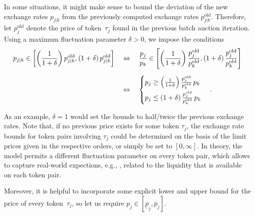 \documentclass[11pt,parskip=full]{scrartcl}%
\newcommand*{\eg}{e.g., }
\begin{document}
In some situations, it might make sense to bound the deviation of the new exchange rates $p_{j|k}$ from the previously computed exchange rates $ p_{j|k}^\mathrm{old} $.
Therefore, let $ p^\mathrm{old}_j $ denote the price of token~$ \tau_j $ found in the previous
batch auction iteration.
Using a maximum fluctuation parameter $ \delta > 0 $, we impose the conditions
\begin{align}
  p_{j|k} \in
  \left[
    \left(\frac{1}{1+\delta}\right) p^\mathrm{old}_{j|k},
    (1+\delta) \, p^\mathrm{old}_{j|k}
  \right]
  \quad &\Leftrightarrow \quad
  \frac{p_j}{p_k} \in
  \left[
    \left(\frac{1}{1+\delta}\right) \frac{p^\mathrm{old}_j}{p^\mathrm{old}_k},
    (1+\delta) \, \frac{p^\mathrm{old}_j}{p^\mathrm{old}_k}
  \right]\notag\\[2mm]
  \quad &\Leftrightarrow \quad
  \begin{cases}
    p_j \ge \left(\frac{1}{1+\delta}\right) \frac{p^\mathrm{old}_j}{p^\mathrm{old}_k} \, p_k
    \\[2mm]
    p_j \le \left(1+\delta\right) \frac{p^\mathrm{old}_j}{p^\mathrm{old}_k} \, p_k
  \end{cases}.
  \label{eq:bounds_xrates}
\end{align}

As an example, $ \delta = 1 $ would set the bounds to half/twice the previous exchange rates.
Note that, if no previous price exists for some token $ \tau_j $, the exchange rate bounds for
token pairs involving $ \tau_j $ could be determined on the basis of the limit prices given in
the respective orders, or simply be set to $ [0,\infty] $.
In theory, the model permits a different fluctuation parameter on every token pair, which allows to
capture real-world expections, \eg, related to the liquidity that is available on each token pair. 

Moreover, it is helpful to incorporate some explicit lower and upper bound for the price of every
token~$ \tau_j $, so let us require $ p_j \in [\underline{p}_j,\overline{p}_j] $.
\end{document}
